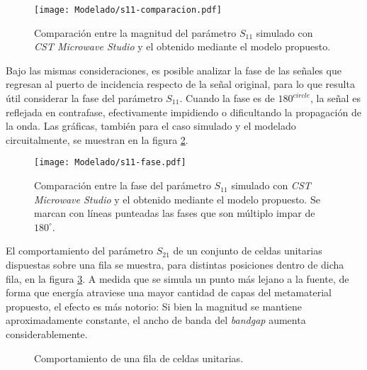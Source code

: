 \begin{figure}[h]
	\centering
	\texttt{[image: Modelado/s11-comparacion.pdf]}
	\caption{Comparación entre la magnitud del parámetro $S_{11}$ simulado con \textit{CST Microwave Studio} y el obtenido mediante el modelo propuesto.}
	\label{fig:s11_comparacion}
\end{figure}


Bajo las mismas consideraciones, es posible analizar la fase de las señales que regresan al puerto de incidencia respecto de la señal original, para lo que resulta útil considerar la fase del parámetro $S_{11}$. Cuando la fase es de $180^{circle}$, la señal es reflejada en contrafase, efectivamente impidiendo o dificultando la propagación de la onda. Las gráficas, también para el caso simulado y el modelado circuitalmente, se muestran en la figura \ref{fig:s11-fase-compracion}.

\begin{figure}[h]
	\centering
	\texttt{[image: Modelado/s11-fase.pdf]}
	\caption{Comparación entre la fase del parámetro $S_{11}$ simulado con \textit{CST Microwave Studio} y el obtenido mediante el modelo propuesto. Se marcan con líneas punteadas las fases que son múltiplo impar de $180^{\circ}$.}
	\label{fig:s11-fase-compracion}
\end{figure}

El comportamiento del parámetro $S_{21}$ de un conjunto de celdas unitarias dispuestas sobre una fila se muestra, para distintas posiciones dentro de dicha fila, en la figura \ref{fig:s12-variacion-pila-super}. A medida que se simula un punto más lejano a la fuente, de forma que energía atraviese una mayor cantidad de capas del metamaterial propuesto, el efecto es más notorio: Si bien la magnitud se mantiene aproximadamente constante, el ancho de banda del \textit{bandgap} aumenta considerablemente.


\begin{figure}[h]
	\centering 
	\hspace{0pt}
	\caption{Comportamiento de una fila de celdas unitarias.}
	\label{fig:s12-variacion-pila-super}	
\end{figure}  

